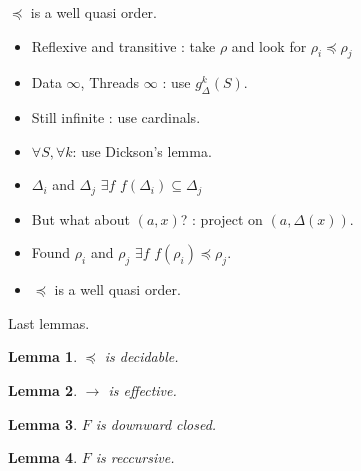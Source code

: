 \documentclass{beamer}
\newtheorem{lm}{Lemma}[thr]
\begin{document}
\begin{frame}{$\preceq$ is a well quasi order.}
 \begin{itemize}
  \pause
  \item Reflexive and transitive \pause : take $\rho$ and look for $\rho_i \preceq \rho_j$ \pause
  \item Data $\infty$, Threads $\infty$ \pause : use $g^k_{\Delta}(S)$.  \pause
  \item Still infinite \pause : use cardinals. \pause
  \item $\forall S, \forall k $: use Dickson's lemma. \pause
  \item $\Delta_i$ and $\Delta_j$ \pause $\exists f $ $f(\Delta_i) \subseteq \Delta_j$ \pause
  \item But what about $(a,x)$? \pause : project on $(a,\Delta(x))$. \pause
  \item Found $\rho_i$ and $\rho_j$ \pause $\exists f $ $f(\rho_i) \preceq \rho_j$. \pause 
  \item $\preceq$ is a well quasi order.
 \end{itemize}

\end{frame}

\begin{frame}{Last lemmas.}
\begin{lm} 
  $\preceq$ is decidable.
\end{lm}
\pause
\begin{lm} 
  $\rightarrow$ is effective.
\end{lm}
\pause
\begin{lm} 
  $F$ is downward closed. 
\end{lm}
\pause
\begin{lm} 
  $F$ is reccursive.
\end{lm}

\end{frame}

% 
\end{document}
